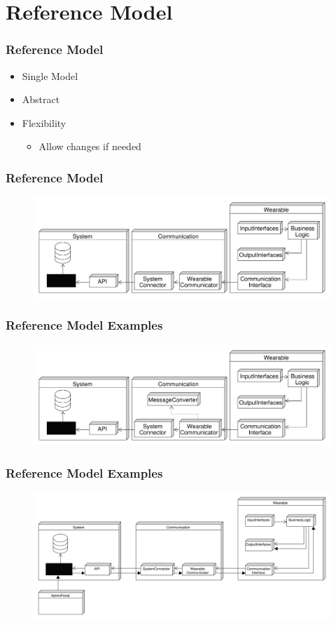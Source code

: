 \section{Reference Model}
\begin{frame}\frametitle{Reference Model}
	\begin{itemize}
		\item Single Model
	\end{itemize}
	\begin{itemize}
		\item Abstract
		\item Flexibility
		\begin{itemize}
			\item Allow changes if needed
		\end{itemize}
	\end{itemize}
\end{frame}
\begin{frame}\frametitle{Reference Model}
	\begin{figure}
		\includegraphics[width=\textwidth]{images/ReferenceModel}
	\end{figure}
\end{frame}
\begin{frame}\frametitle{Reference Model Examples}
	\begin{figure}
		\includegraphics[width=\textwidth]{images/ReferenceModel_Converter}
	\end{figure}
\end{frame}
\begin{frame}\frametitle{Reference Model Examples}
	\begin{figure}
		\includegraphics[width=\textwidth]{images/PackageModel_ReferenceArchitecture_PushMessages}
	\end{figure}
\end{frame}
